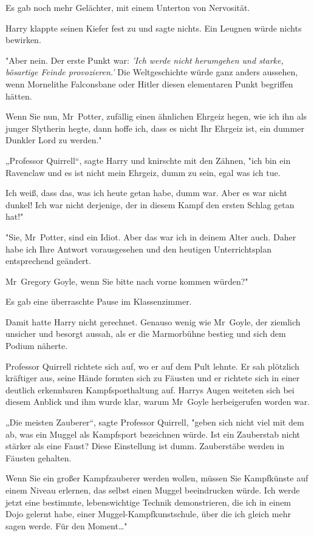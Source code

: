 {Es gab noch mehr Gelächter, mit einem Unterton von Nervosität.

Harry klappte seinen Kiefer fest zu und sagte nichts. Ein Leugnen würde nichts bewirken.

"Aber nein. Der erste Punkt war: \emph{'Ich werde nicht herumgehen und starke, bösartige Feinde provozieren.'} Die Weltgeschichte würde ganz anders aussehen, wenn Mornelithe Falconsbane oder Hitler diesen elementaren Punkt begriffen hätten.

Wenn Sie nun, Mr~Potter, zufällig einen ähnlichen Ehrgeiz hegen, wie ich ihn als junger Slytherin hegte, dann hoffe ich, dass es nicht Ihr Ehrgeiz ist, ein dummer Dunkler Lord zu werden."

„Professor Quirrell“, sagte Harry und knirschte mit den Zähnen, "ich bin ein Ravenclaw und es ist nicht mein Ehrgeiz, dumm zu sein, egal was ich tue.

Ich weiß, dass das, was ich heute getan habe, dumm war. Aber es war nicht dunkel! Ich war nicht derjenige, der in diesem Kampf den ersten Schlag getan hat!"

"Sie, Mr~Potter, sind ein Idiot. Aber das war ich in deinem Alter auch. Daher habe ich Ihre Antwort vorausgesehen und den heutigen Unterrichtsplan entsprechend geändert.

Mr~Gregory Goyle, wenn Sie bitte nach vorne kommen würden?"

Es gab eine überraschte Pause im Klassenzimmer.

Damit hatte Harry nicht gerechnet. Genauso wenig wie Mr~Goyle, der ziemlich unsicher und besorgt aussah, als er die Marmorbühne bestieg und sich dem Podium näherte.

Professor Quirrell richtete sich auf, wo er auf dem Pult lehnte. Er sah plötzlich kräftiger aus, seine Hände formten sich zu Fäusten und er richtete sich in einer deutlich erkennbaren Kampfsporthaltung auf. Harrys Augen weiteten sich bei diesem Anblick und ihm wurde klar, warum Mr~Goyle herbeigerufen worden war.

„Die meisten Zauberer“, sagte Professor Quirrell, "geben sich nicht viel mit dem ab, was ein Muggel als Kampfsport bezeichnen würde. Ist ein Zauberstab nicht stärker als eine Faust? Diese Einstellung ist dumm. Zauberstäbe werden in Fäusten gehalten.

Wenn Sie ein großer Kampfzauberer werden wollen, müssen Sie Kampfkünste auf einem Niveau erlernen, das selbst einen Muggel beeindrucken würde. Ich werde jetzt eine bestimmte, lebenswichtige Technik demonstrieren, die ich in einem Dojo gelernt habe, einer Muggel-Kampfkunstschule, über die ich gleich mehr sagen werde. Für den Moment…"

}
